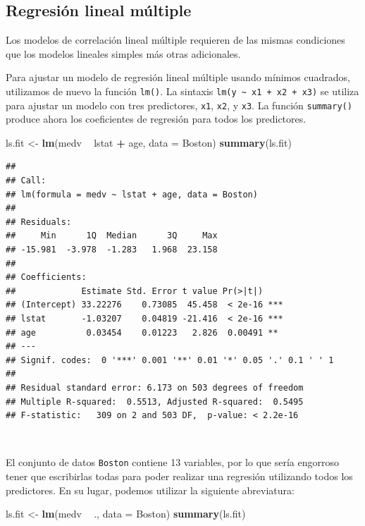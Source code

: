 \documentclass[]{book}
\newenvironment{Shaded}{\begin{snugshade}}{\end{snugshade}}
\newcommand{\KeywordTok}[1]{\textcolor[rgb]{0.13,0.29,0.53}{\textbf{#1}}}
\newcommand{\DataTypeTok}[1]{\textcolor[rgb]{0.13,0.29,0.53}{#1}}
\newcommand{\StringTok}[1]{\textcolor[rgb]{0.31,0.60,0.02}{#1}}
\newcommand{\OperatorTok}[1]{\textcolor[rgb]{0.81,0.36,0.00}{\textbf{#1}}}
\newcommand{\NormalTok}[1]{#1}
\begin{document}
\subsection{Regresión lineal
múltiple}\label{regresiuxf3n-lineal-muxfaltiple}

Los modelos de correlación lineal múltiple requieren de las mismas
condiciones que los modelos lineales simples más otras adicionales.

Para ajustar un modelo de regresión lineal múltiple usando mínimos
cuadrados, utilizamos de nuevo la función \texttt{lm()}. La sintaxis
\texttt{lm(y\ \textasciitilde{}\ x1\ +\ x2\ +\ x3)} se utiliza para
ajustar un modelo con tres predictores, \texttt{x1}, \texttt{x2}, y
\texttt{x3}. La función \texttt{summary()} produce ahora los
coeficientes de regresión para todos los predictores.

\begin{Shaded}
\begin{Highlighting}[]
\NormalTok{ls.fit <-}\StringTok{ }\KeywordTok{lm}\NormalTok{(medv }\OperatorTok{~}\StringTok{ }\NormalTok{lstat }\OperatorTok{+}\StringTok{ }\NormalTok{age, }\DataTypeTok{data =}\NormalTok{ Boston)}
\KeywordTok{summary}\NormalTok{(ls.fit)}
\end{Highlighting}
\end{Shaded}

\begin{verbatim}
## 
## Call:
## lm(formula = medv ~ lstat + age, data = Boston)
## 
## Residuals:
##     Min      1Q  Median      3Q     Max 
## -15.981  -3.978  -1.283   1.968  23.158 
## 
## Coefficients:
##             Estimate Std. Error t value Pr(>|t|)    
## (Intercept) 33.22276    0.73085  45.458  < 2e-16 ***
## lstat       -1.03207    0.04819 -21.416  < 2e-16 ***
## age          0.03454    0.01223   2.826  0.00491 ** 
## ---
## Signif. codes:  0 '***' 0.001 '**' 0.01 '*' 0.05 '.' 0.1 ' ' 1
## 
## Residual standard error: 6.173 on 503 degrees of freedom
## Multiple R-squared:  0.5513, Adjusted R-squared:  0.5495 
## F-statistic:   309 on 2 and 503 DF,  p-value: < 2.2e-16
\end{verbatim}

~

El conjunto de datos \texttt{Boston} contiene 13 variables, por lo que
sería engorroso tener que escribirlas todas para poder realizar una
regresión utilizando todos los predictores. En su lugar, podemos
utilizar la siguiente abreviatura:

\begin{Shaded}
\begin{Highlighting}[]
\NormalTok{ls.fit <-}\StringTok{ }\KeywordTok{lm}\NormalTok{(medv }\OperatorTok{~}\StringTok{ }\NormalTok{., }\DataTypeTok{data =}\NormalTok{ Boston)}
\KeywordTok{summary}\NormalTok{(ls.fit)}
\end{Highlighting}
\end{Shaded}
\end{document}
